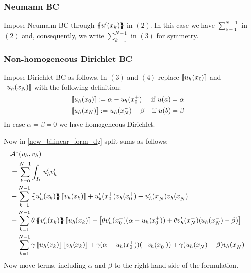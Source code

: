 \subsubsection*{Neumann BC}
Impose Neumann BC through \(\left\{\mspace{-6.5mu}\left\{u'(x_k)\right\}\mspace{-6.5mu}\right\}\) in \((2)\). In this case we have \(\sum_{k=1}^{N-1}\) in \((2)\) and, consequently, we write \(\sum_{k=1}^{N-1}\) in \((3)\) for symmetry.
\subsubsection*{Non-homogeneous Dirichlet BC}
Impose Dirichlet BC as follows. In \((3)\) and \((4)\) replace \(\left[\!\left[u_h(x_0)\right]\!\right]\) and \(\left[\!\left[u_h(x_N)\right]\!\right]\) with the following definition:
\begin{align*}
    &\left[\!\left[u_h(x_0)\right]\!\right] := \alpha - u_h(x_0^+) & \text{if } u(a) = \alpha \\
    &\left[\!\left[u_h(x_N)\right]\!\right] :=  u_h(x_N^-) - \beta & \text{if } u(b) = \beta
\end{align*}
In case \(\alpha =  \beta = 0\) we have homogeneous Dirichlet. 

Now in \eqref{new_bilinear_form_dg} split sums as follows: 
\begin{equation}
    \begin{split}        
    & \mathcal{A}^*(u_h, v_h)\\
    & = \sum_{k=0}^{N-1} \int_{I_k} u'_h v'_h \\
        & - \sum_{k=1}^{N-1} \average{u'_h(x_k)}\jump{v_h(x_k)} + u'_h(x_0^+)v_h(x_0^+) - u'_h(x_N^-)v_h(x_N^-) \\
        & - \sum_{k=1}^{N-1} \theta \average{v'_h(x_k)} \jump{u_h(x_k)} - \left[\theta v'_h(x^+_0)(\alpha - u_h(x^+_0)) + \theta v'_h(x^-_N)(u_h(x^-_N) - \beta)\right] \\
        & - \sum_{k=1}^{N-1} \gamma \jump{u_h(x_k)} \jump{v_h(x_k)} + \gamma(\alpha - u_h(x^+_0))(-v_h(x^+_0)) + \gamma (u_h(x_N^-) - \beta)v_h(x_N^-) \label{split_sum_bilinear_dg}
    \end{split}
\end{equation}
Now move terms, including \(\alpha\) and \(\beta\) to the right-hand side of the formulation.

